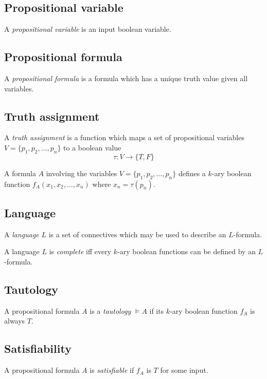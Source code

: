 \documentclass{article}
\begin{document}
\subsection{Propositional variable}

A \textit{propositional variable} is an input boolean variable.

\subsection{Propositional formula}

A \textit{propositional formula} is a formula which has a unique truth value given all variables.

\subsection{Truth assignment}

A \textit{truth assignment} is a function which maps a set of propositional
variables \(V=\{p_1, p_2, \ldots, p_n\}\) to a boolean value
\[
    \tau: V \to \{T,F\}
\]

A formula \(A\) involving the variables \(V=\{p_1, p_2, \ldots, p_n\}\)
defines a \(k\)-ary boolean function \(f_A(x_1, x_2, \ldots, x_n)\) where \(x_n = \tau(p_n)\).

\subsection{Language}

A \textit{language} \(L\) is a set of connectives which may be used to describe
an \(L\)-formula.

A language \(L\) is \textit{complete} iff every \(k\)-ary boolean functions can be
defined by an \(L\)-formula.

\subsection{Tautology}

A propositional formula \(A\) is a \textit{tautology} \(\vDash A\) if its \(k\)-ary boolean
function \(f_A\) is always \(T\).

\subsection{Satisfiability}

A propositional formula \(A\) is \textit{satisfiable}
if \(f_A\) is \(T\) for some input.
\end{document}
